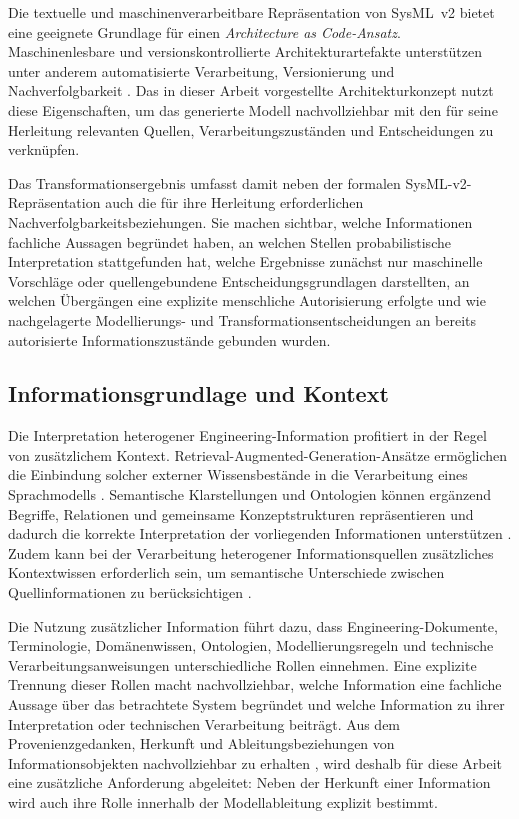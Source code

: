 Die textuelle und maschinenverarbeitbare Repräsentation von SysML~v2 bietet
eine geeignete Grundlage für einen \emph{Architecture as Code-Ansatz}.
Maschinenlesbare und versionskontrollierte Architekturartefakte unterstützen
unter anderem automatisierte Verarbeitung, Versionierung und
Nachverfolgbarkeit \cite{Bucaioni2025,Stirbu2022}. Das in dieser Arbeit
vorgestellte Architekturkonzept nutzt diese Eigenschaften, um das generierte
Modell nachvollziehbar mit den für seine Herleitung relevanten Quellen,
Verarbeitungszuständen und Entscheidungen zu verknüpfen.

Das Transformationsergebnis umfasst damit neben der formalen
SysML-v2-Repräsentation auch die für ihre Herleitung erforderlichen
Nachverfolgbarkeitsbeziehungen. Sie machen sichtbar, welche Informationen
fachliche Aussagen begründet haben, an welchen Stellen probabilistische
Interpretation stattgefunden hat, welche Ergebnisse zunächst nur
maschinelle Vorschläge oder quellengebundene Entscheidungsgrundlagen
darstellten, an welchen Übergängen eine explizite menschliche Autorisierung
erfolgte und wie nachgelagerte Modellierungs- und
Transformationsentscheidungen an bereits autorisierte Informationszustände
gebunden wurden.

\subsection{Informationsgrundlage und Kontext}
\label{sec:architecture_information_authority}

Die Interpretation heterogener Engineering-Information profitiert in der
Regel von zusätzlichem Kontext. Retrieval-Augmented-Generation-Ansätze
ermöglichen die Einbindung solcher externer Wissensbestände in die
Verarbeitung eines Sprachmodells \cite{Chis.2025}. Semantische Klarstellungen
und Ontologien können ergänzend Begriffe, Relationen und gemeinsame
Konzeptstrukturen repräsentieren und dadurch die korrekte Interpretation der
vorliegenden Informationen unterstützen
\cite{Abonyi.2024,ISO21838_2_2021}. Zudem kann bei der Verarbeitung
heterogener Informationsquellen zusätzliches Kontextwissen erforderlich
sein, um semantische Unterschiede zwischen Quellinformationen zu
berücksichtigen \cite{Bressan.2000}.

Die Nutzung zusätzlicher Information führt dazu, dass Engineering-Dokumente,
Terminologie, Domänenwissen, Ontologien, Modellierungsregeln und technische
Verarbeitungsanweisungen unterschiedliche Rollen einnehmen. Eine explizite
Trennung dieser Rollen macht nachvollziehbar, welche Information eine
fachliche Aussage über das betrachtete System begründet und welche
Information zu ihrer Interpretation oder technischen Verarbeitung beiträgt.
Aus dem Provenienzgedanken, Herkunft und Ableitungsbeziehungen von
Informationsobjekten nachvollziehbar zu erhalten
\cite{MoreauMissier2013}, wird deshalb für diese Arbeit eine zusätzliche
Anforderung abgeleitet: Neben der Herkunft einer Information wird auch ihre
Rolle innerhalb der Modellableitung explizit bestimmt.

